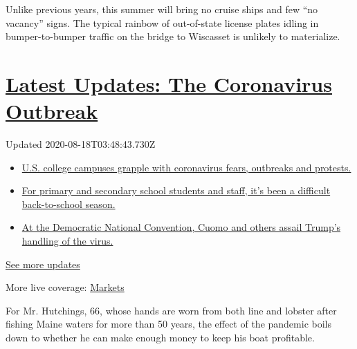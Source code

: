 Unlike previous years, this summer will bring no cruise ships and few
``no vacancy'' signs. The typical rainbow of out-of-state license plates
idling in bumper-to-bumper traffic on the bridge to Wiscasset is
unlikely to materialize.

\hypertarget{latest-updates-the-coronavirus-outbreak}{%
\section{\texorpdfstring{\href{https://www.nytimes.com/2020/08/17/world/coronavirus-covid.html?action=click\&pgtype=Article\&state=default\&region=MAIN_CONTENT_1\&context=storylines_live_updates}{Latest
Updates: The Coronavirus
Outbreak}}{Latest Updates: The Coronavirus Outbreak}}\label{latest-updates-the-coronavirus-outbreak}}

Updated 2020-08-18T03:48:43.730Z

\begin{itemize}
\tightlist
\item
  \href{https://www.nytimes.com/2020/08/17/world/coronavirus-covid.html?action=click\&pgtype=Article\&state=default\&region=MAIN_CONTENT_1\&context=storylines_live_updates\#link-6fdbc8ef}{U.S.
  college campuses grapple with coronavirus fears, outbreaks and
  protests.}
\item
  \href{https://www.nytimes.com/2020/08/17/world/coronavirus-covid.html?action=click\&pgtype=Article\&state=default\&region=MAIN_CONTENT_1\&context=storylines_live_updates\#link-7e47207}{For
  primary and secondary school students and staff, it's been a difficult
  back-to-school season.}
\item
  \href{https://www.nytimes.com/2020/08/17/world/coronavirus-covid.html?action=click\&pgtype=Article\&state=default\&region=MAIN_CONTENT_1\&context=storylines_live_updates\#link-44c3fee2}{At
  the Democratic National Convention, Cuomo and others assail Trump's
  handling of the virus.}
\end{itemize}

\href{https://www.nytimes.com/2020/08/17/world/coronavirus-covid.html?action=click\&pgtype=Article\&state=default\&region=MAIN_CONTENT_1\&context=storylines_live_updates}{See
more updates}

More live coverage:
\href{https://www.nytimes.com/live/2020/08/17/business/stock-market-today-coronavirus?action=click\&pgtype=Article\&state=default\&region=MAIN_CONTENT_1\&context=storylines_live_updates}{Markets}

For Mr. Hutchings, 66, whose hands are worn from both line and lobster
after fishing Maine waters for more than 50 years, the effect of the
pandemic boils down to whether he can make enough money to keep his boat
profitable.

